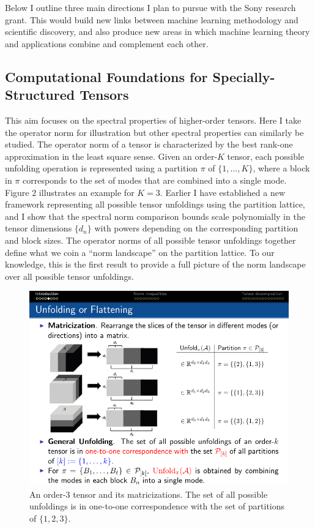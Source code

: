 \documentclass[10pt]{article}
\theoremstyle{definition}
\theoremstyle{definition}
\theoremstyle{definition}
\begin{document}
Below I outline three main directions I plan to pursue with the Sony research grant. This would build new links between machine learning methodology and scientific discovery, and also produce new areas in which machine learning theory and applications combine and complement each other. 


\subsection{Computational Foundations for Specially-Structured Tensors} \label{sec:aim1}
This aim focuses on the spectral properties of higher-order tensors. Here I take the operator norm for illustration but other spectral properties can similarly be studied. The operator norm of a tensor is characterized by the best rank-one approximation in the least square sense. Given an order-$K$ tensor, each possible unfolding operation is represented using a partition $\pi$ of $\{1, . . . , K\}$, where a block in $\pi$ corresponds to the set of modes that are combined into a single mode. Figure 2 illustrates an example for $K = 3$. Earlier I have established a new framework representing all possible tensor unfoldings using the partition lattice, and I show that the spectral norm comparison bounds scale polynomially in the tensor dimensions $\{d_n\}$ with powers depending on the corresponding partition and block sizes. The operator norms of all possible tensor unfoldings together define what we coin a ``norm landscape'' on the partition lattice. To our knowledge, this is the first result to provide a full picture of the norm landscape over all possible tensor unfoldings.

\begin{figure}[http]
\centering
\includegraphics[width=.62\textwidth]{flattern.pdf}
\caption{\small An order-$3$ tensor and its matricizations. The set of all possible unfoldings is in one-to-one correspondence with the set of partitions of $\{1,2, 3\}$.
} \label{fig:1}
\end{figure}
\end{document}
